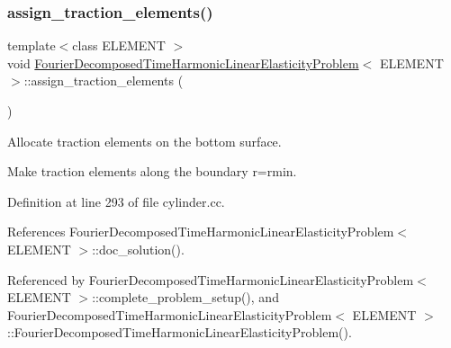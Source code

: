 \subsubsection{\texorpdfstring{assign\+\_\+traction\+\_\+elements()}{assign\_traction\_elements()}\hspace{0.1cm}{\footnotesize\ttfamily [2/3]}}
{\footnotesize\ttfamily template$<$class E\+L\+E\+M\+E\+NT $>$ \\
void \hyperlink{classFourierDecomposedTimeHarmonicLinearElasticityProblem}{Fourier\+Decomposed\+Time\+Harmonic\+Linear\+Elasticity\+Problem}$<$ E\+L\+E\+M\+E\+NT $>$\+::assign\+\_\+traction\+\_\+elements (\begin{DoxyParamCaption}{ }\end{DoxyParamCaption})\hspace{0.3cm}{\ttfamily [private]}}



Allocate traction elements on the bottom surface. 

Make traction elements along the boundary r=rmin. 

Definition at line 293 of file cylinder.\+cc.



References Fourier\+Decomposed\+Time\+Harmonic\+Linear\+Elasticity\+Problem$<$ E\+L\+E\+M\+E\+N\+T $>$\+::doc\+\_\+solution().



Referenced by Fourier\+Decomposed\+Time\+Harmonic\+Linear\+Elasticity\+Problem$<$ E\+L\+E\+M\+E\+N\+T $>$\+::complete\+\_\+problem\+\_\+setup(), and Fourier\+Decomposed\+Time\+Harmonic\+Linear\+Elasticity\+Problem$<$ E\+L\+E\+M\+E\+N\+T $>$\+::\+Fourier\+Decomposed\+Time\+Harmonic\+Linear\+Elasticity\+Problem().

\mbox{\label{classFourierDecomposedTimeHarmonicLinearElasticityProblem_ab995077cbd92377b726d0ea0de81720e}} 
